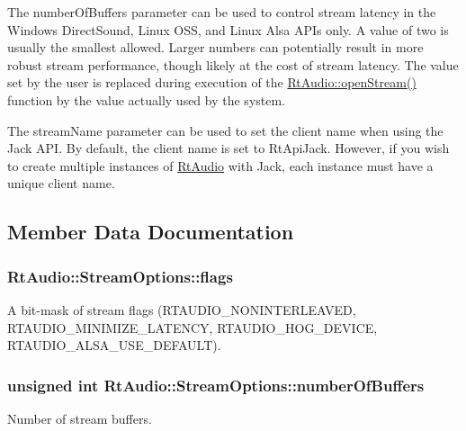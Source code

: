The {\ttfamily number\+Of\+Buffers} parameter can be used to control stream latency in the Windows Direct\+Sound, Linux O\+SS, and Linux Alsa A\+P\+Is only. A value of two is usually the smallest allowed. Larger numbers can potentially result in more robust stream performance, though likely at the cost of stream latency. The value set by the user is replaced during execution of the \hyperlink{class_rt_audio_a6907539d2527775df778ebce32ef1e3b}{Rt\+Audio\+::open\+Stream()} function by the value actually used by the system.

The {\ttfamily stream\+Name} parameter can be used to set the client name when using the Jack A\+PI. By default, the client name is set to Rt\+Api\+Jack. However, if you wish to create multiple instances of \hyperlink{class_rt_audio}{Rt\+Audio} with Jack, each instance must have a unique client name. 

\subsection{Member Data Documentation}
\subsubsection[{flags}]{ Rt\+Audio\+::\+Stream\+Options\+::flags}\hypertarget{struct_rt_audio_1_1_stream_options_a0ecc98b031aa3af49d09b781643e298b}{}\label{struct_rt_audio_1_1_stream_options_a0ecc98b031aa3af49d09b781643e298b}
A bit-\/mask of stream flags (R\+T\+A\+U\+D\+I\+O\+\_\+\+N\+O\+N\+I\+N\+T\+E\+R\+L\+E\+A\+V\+ED, R\+T\+A\+U\+D\+I\+O\+\_\+\+M\+I\+N\+I\+M\+I\+Z\+E\+\_\+\+L\+A\+T\+E\+N\+CY, R\+T\+A\+U\+D\+I\+O\+\_\+\+H\+O\+G\+\_\+\+D\+E\+V\+I\+CE, R\+T\+A\+U\+D\+I\+O\+\_\+\+A\+L\+S\+A\+\_\+\+U\+S\+E\+\_\+\+D\+E\+F\+A\+U\+LT). 
\subsubsection[{number\+Of\+Buffers}]{\setlength{\rightskip}{0pt plus 5cm}unsigned int Rt\+Audio\+::\+Stream\+Options\+::number\+Of\+Buffers}\hypertarget{struct_rt_audio_1_1_stream_options_a75a14cfab903d0e1c091bc16aec80240}{}\label{struct_rt_audio_1_1_stream_options_a75a14cfab903d0e1c091bc16aec80240}
Number of stream buffers. 
